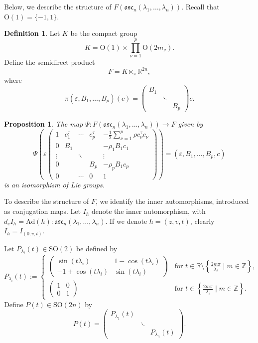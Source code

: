 \documentclass[12pt]{amsart}
\theoremstyle{plain}
\newtheorem{prop}[thm]{Proposition}
\theoremstyle{definition}
\newtheorem{defn}[thm]{Definition}
\theoremstyle{remark}
\begin{document}
Below, we describe the structure of \( F(\mathfrak{osc}_n(\lambda_1, \ldots, \lambda_n)) \). Recall that \( \mathrm{O}(1) = \{-1, 1\} \).
 

\begin{defn}
    Let \( K \) be the compact group
    \[
    K = \mathrm{O}(1) \times \prod_{\nu=1}^p \mathrm{O}(2m_{\nu}).
    \]
    Define the semidirect product
    \[
    F = K \ltimes_{\pi} \mathbb{R}^{2n},
    \]
    where
    \[
    \pi(\varepsilon, B_1, \ldots, B_p)(c) = \left( \begin{matrix}
    B_1  & & \\
     & \ddots & \\
      & & B_p
    \end{matrix} \right) c.
    \]	
\end{defn}

\begin{prop}
    The map \( \Psi: F(\mathfrak{osc}_n(\lambda_1, \ldots, \lambda_n)) \to F \) given by
    \[
    \Psi \left( \varepsilon  \left( 
    \begin{matrix} 
    1 & c_1^{\tau} & \cdots & c_p^{\tau} & -\frac{1}{2} \sum_{\nu=1}^p \rho c_{\nu}^{\tau} c_{\nu} \\
    0 & B_1 & & & -\rho_1 B_1 c_1 \\
    \vdots & & \ddots & & \vdots \\
    0 & & & B_p & -\rho_p B_1 c_p \\
    0 & & \cdots & 0 & 1
    \end{matrix}\right) \right) = (\varepsilon, B_1, \ldots, B_p, c)
    \]
    is an isomorphism of Lie groups.
\end{prop}

To describe the structure of \( F \), we identify the inner automorphisms, introduced as conjugation maps. Let \( I_h \) denote the inner automorphism, with \( d_e I_h = \text{Ad}(h): \mathfrak{osc}_n(\lambda_1, \ldots, \lambda_n) \). If we denote \( h = (z, v, t) \), clearly \( I_h = I_{(0, v, t)} \).

Let \( P_{\lambda_i}(t) \in \mathrm{SO}(2) \) be defined by
\[
P_{\lambda_i}(t) := \left\{
    \begin{array}{cl}
    \left( \begin{matrix}
    \sin(t\lambda_i) & 1 - \cos(t\lambda_i) \\
    -1 + \cos(t\lambda_i) & \sin(t\lambda_i)
    \end{matrix} \right) & \text{for } t \in \mathbb{R} \setminus \left\{\frac{2m\pi}{\lambda_i} \mid m \in \mathbb{Z}\right\}, \\
    \left( \begin{matrix}
    1 & 0 \\
    0 & 1
    \end{matrix} \right) & \text{for } t \in \left\{\frac{2m\pi}{\lambda_i} \mid m \in \mathbb{Z}\right\}.
    \end{array}
\right.
\]
Define \( P(t) \in \mathrm{SO}(2n) \) by
\[
P(t) = \left( \begin{matrix}
P_{\lambda_1}(t) & & \\
& \ddots & \\
& & P_{\lambda_n}(t)
\end{matrix} \right).
\]
\end{document}
